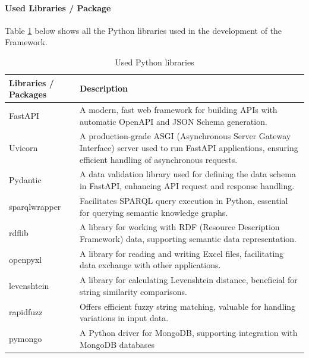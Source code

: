         \paragraph{Used Libraries / Package}
        Table \ref{tab:python-libs} below shows all the Python libraries used in the development of the Framework.
        
        \begin{table}[h]
            \centering
    	    {
    	    \begin{tabular}{ | m{2.5cm} | m{12cm} | }
                \hline
                \rowcolor{teal!30} Libraries / Packages & Description \\
                
                \hline
                FastAPI & A modern, fast web framework for building APIs with automatic OpenAPI and JSON Schema generation.\\

                \hline
                Uvicorn & A production-grade ASGI (Asynchronous Server Gateway Interface) server used to run FastAPI applications, ensuring efficient handling of asynchronous requests.\\

                \hline
                Pydantic & A data validation library used for defining the data schema in FastAPI, enhancing API request and response handling.\\

                \hline
                sparqlwrapper & Facilitates SPARQL query execution in Python, essential for querying semantic knowledge graphs.\\

                \hline
                rdflib & A library for working with RDF (Resource Description Framework) data, supporting semantic data representation.\\

                \hline
                openpyxl & A library for reading and writing Excel files, facilitating data exchange with other applications.\\

                \hline
                levenshtein & A library for calculating Levenshtein distance, beneficial for string similarity comparisons.\\

                \hline
                rapidfuzz & Offers efficient fuzzy string matching, valuable for handling variations in input data.\\

                \hline
                pymongo & A Python driver for MongoDB, supporting integration with MongoDB databases\\
                
                \hline
            \end{tabular}}
            \caption{\label{tab:python-libs} Used Python libraries}
        \end{table}
    
